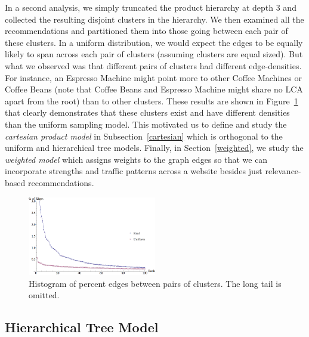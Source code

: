 In a second analysis, we simply truncated the product hierarchy
at depth 3 and collected the resulting disjoint clusters in the hierarchy. We
then examined all the recommendations and partitioned them into those going between each pair of these clusters. In a uniform distribution, we would expect the
edges to be equally likely to span across each pair of clusters
(assuming clusters are equal sized). But what we observed was that
different pairs of clusters had different edge-densities. For instance, an Espresso Machine might point more to other Coffee Machines or
Coffee Beans (note that Coffee Beans and Espresso Machine might share
no LCA apart from the root) than to other clusters. These results are
shown in Figure~\ref{fig:cart-emp} that clearly demonstrates that these
clusters exist and have different densities than the uniform sampling model. This
motivated us to define and study the {\em cartesian product model} in
Subsection~\ref{cartesian} which is orthogonal to the uniform and
hierarchical tree models. Finally, in Section~\ref{weighted}, we study the {\em weighted model}
which assigns weights to the graph edges so that we can incorporate strengths and traffic
patterns across a website besides just relevance-based recommendations.

\begin{figure}
\centering
\includegraphics[width=0.5\textwidth]{images/cartesian_histogram.png}
\begin{minipage}{1\textwidth}
\caption{Histogram of percent edges between pairs of clusters. The long tail is omitted.}
\label{fig:cart-emp}
\vspace{-0.2in}
\end{minipage}
\end{figure}

\subsection{Hierarchical Tree Model}
\label{hierarchy}

